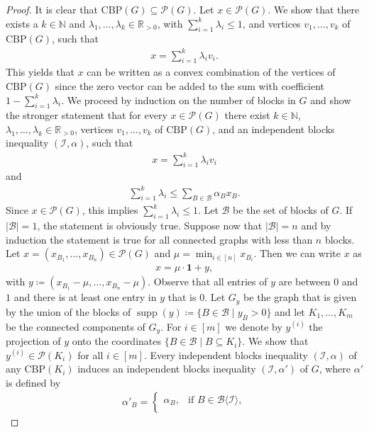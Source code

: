 \documentclass[12pt]{amsart}
\DeclareMathOperator{\supp}{\mathrm{supp}}
\newcommand{\R}{\mathbb{R}}
\newcommand{\CBP}{\mathrm{CBP}}
\renewcommand{\P}{\mathcal{P}}
\newcommand{\I}{\mathcal{I}}
\newcommand{\B}{\mathcal{B}}
\begin{document}
\begin{proof}
    It is clear that $\CBP(G) \subseteq \P(G)$. Let $x \in \P(G)$. We show that there exists a $k \in \mathbb{N}$ and $\lambda_1,\ldots,\lambda_k \in \R_{>0}$, with $\sum_{i=1}^k \lambda_i \le 1$, and vertices $v_1,\ldots,v_k$ of $\CBP(G)$, such that
    \begin{align*}
        x=\sum_{i=1}^k \lambda_iv_i.
    \end{align*}
    This yields that $x$ can be written as a convex combination of the vertices of $\CBP(G)$ since the zero vector can be added to the sum with coefficient $1-\sum_{i=1}^k \lambda_i$. We proceed by induction on the number of blocks in $G$ and show the stronger statement that for every $x \in \P(G)$ there exist $k \in \mathbb{N}$, $\lambda_1,\ldots,\lambda_k \in \R_{>0}$, vertices $v_1,\ldots,v_k$ of $\CBP(G)$, and an independent blocks inequality $(\I,\alpha)$, such that
    \begin{align*}
        x=\sum_{i=1}^k \lambda_iv_i
    \end{align*}
    and
    \begin{align*}
        \sum_{i=1}^k \lambda_i \le \sum_{B \in \B}\alpha_Bx_B.
    \end{align*}
    Since $x \in \P(G)$, this implies $\sum_{i=1}^k \lambda_i \le 1$. Let $\B$ be the set of blocks of $G$. If $\vert \B \vert=1$, the statement is obviously true. Suppose now that $\vert \B \vert=n$ and by induction the statement is true for all connected graphs with less than $n$ blocks. Let $x=(x_{B_1},\ldots,x_{B_n}) \in \P(G)$ and $\mu=\min_{i \in [n]}x_{B_i}$. Then we can write $x$ as
    \begin{align*}
        x=\mu \cdot \mathbf{1}+y,
    \end{align*}
    with $y\coloneqq (x_{B_1}-\mu,\ldots,x_{B_n}-\mu)$. Observe that all entries of $y$ are between $0$ and $1$ and there is at least one entry in $y$ that is $0$. Let $G_y$ be the graph that is given by the union of the blocks of $\supp(y)\coloneqq \{B \in \B \mid y_B > 0\}$ and let $K_1,\ldots,K_m$ be the connected components of $G_y$. For $i\in [m]$ we denote by $y^{(i)}$ the projection of $y$ onto the coordinates $\{B \in \B \mid B \subseteq K_i\}$. We show that $y^{(i)} \in \P(K_i)$ for all $i \in [m]$. Every independent blocks inequality $(\I,\alpha)$ of any $\CBP(K_i)$ induces an independent blocks inequality $(\I,\alpha')$ of $G$, where $\alpha'$ is defined by
    \begin{align*}
        \alpha'_B=\begin{cases}\alpha_B, & \text{if } B \in \B\langle\I\rangle, \\

\end{cases}
\end{align*}
\end{proof}
\end{document}
